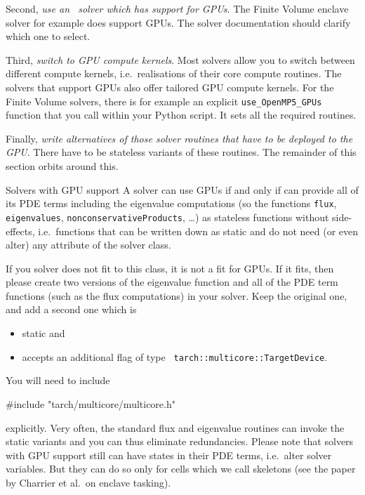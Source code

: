 Second, \emph{use an \ExaHyPE\ solver which has support for GPUs}. 
The Finite Volume enclave solver for example does support GPUs. 
The solver documentation should clarify which one to select.


Third, \emph{switch to GPU compute kernels}.
Most solvers allow you to switch between different compute kernels,
i.e.~realisations of their core compute routines.
The solvers that support GPUs also offer tailored GPU compute kernels.
For the Finite Volume solvers, there is for example an explicit
\texttt{use\_OpenMP5\_GPUs} function that you call within your Python
script.
It sets all the required routines.



Finally, \emph{write alternatives of those solver routines that have to be
deployed to the GPU}.
There have to be stateless variants of these routines.
The remainder of this section orbits around this.


\begin{definition}{Solvers with GPU support}
 A solver can use GPUs if and only if can provide all of its PDE terms
 including the eigenvalue computations (so the functions \texttt{flux},
 \texttt{eigenvalues}, \texttt{nonconservativeProducts}, \ldots) as stateless
 functions without side-effects, i.e.~functions that can be written down as
 static and do not need (or even alter) any attribute of the solver class.
\end{definition}

\noindent
If you solver does not fit to this class, it is not a fit for GPUs.
If it fits, then please create two versions of the eigenvalue function and all
of the PDE term functions (such as the flux computations) in your solver.
Keep the original one, and add a second one which is 

\begin{itemize}
  \item static and 
  \item accepts an additional flag of type \texttt{
  tarch::multicore::TargetDevice}.
\end{itemize}

\noindent
You will need to include 
\begin{code}
#include "tarch/multicore/multicore.h"
\end{code} 

\noindent
explicitly. Very often, the standard flux and eigenvalue routines can invoke the
static variants and you can thus eliminate redundancies.
Please note that solvers with GPU support still can have states in their PDE
terms, i.e.~alter solver variables.
But they can do so only for cells which we call skeletons (see the paper by
Charrier et al.~on enclave tasking).


